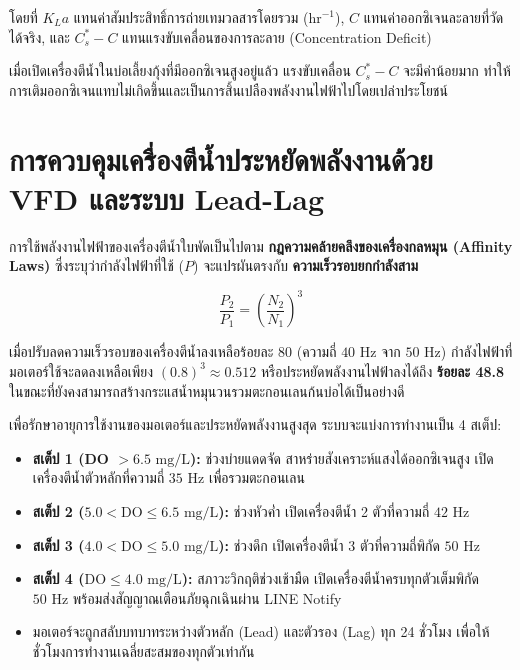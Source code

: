 โดยที่ $K_L a$ แทนค่าสัมประสิทธิ์การถ่ายเทมวลสารโดยรวม ($\text{hr}^{-1}$), $C$ แทนค่าออกซิเจนละลายที่วัดได้จริง, และ $C^*_s - C$ แทนแรงขับเคลื่อนของการละลาย (Concentration Deficit)

เมื่อเปิดเครื่องตีน้ำในบ่อเลี้ยงกุ้งที่มีออกซิเจนสูงอยู่แล้ว แรงขับเคลื่อน $C^*_s - C$ จะมีค่าน้อยมาก ทำให้การเติมออกซิเจนแทบไม่เกิดขึ้นและเป็นการสิ้นเปลืองพลังงานไฟฟ้าไปโดยเปล่าประโยชน์

\section{การควบคุมเครื่องตีน้ำประหยัดพลังงานด้วย VFD และระบบ Lead-Lag}

การใช้พลังงานไฟฟ้าของเครื่องตีน้ำใบพัดเป็นไปตาม \textbf{กฎความคล้ายคลึงของเครื่องกลหมุน (Affinity Laws)} ซึ่งระบุว่ากำลังไฟฟ้าที่ใช้ ($P$) จะแปรผันตรงกับ \textbf{ความเร็วรอบยกกำลังสาม}

\begin{equation}
\frac{P_2}{P_1} = \left( \frac{N_2}{N_1} \right)^3
\label{eq:affinity_laws}
\end{equation}

เมื่อปรับลดความเร็วรอบของเครื่องตีน้ำลงเหลือร้อยละ 80 (ความถี่ $40\text{ Hz}$ จาก $50\text{ Hz}$) กำลังไฟฟ้าที่มอเตอร์ใช้จะลดลงเหลือเพียง $(0.8)^3 \approx 0.512$ หรือประหยัดพลังงานไฟฟ้าลงได้ถึง \textbf{ร้อยละ 48.8} ในขณะที่ยังคงสามารถสร้างกระแสน้ำหมุนวนรวมตะกอนเลนก้นบ่อได้เป็นอย่างดี

\begin{theorybox}
เพื่อรักษาอายุการใช้งานของมอเตอร์และประหยัดพลังงานสูงสุด ระบบจะแบ่งการทำงานเป็น 4 สเต็ป:
\begin{itemize}[leftmargin=1.5em]
    \item \textbf{สเต็ป 1 (DO $> 6.5\text{ mg/L}$):} ช่วงบ่ายแดดจัด สาหร่ายสังเคราะห์แสงได้ออกซิเจนสูง เปิดเครื่องตีน้ำตัวหลักที่ความถี่ $35\text{ Hz}$ เพื่อรวมตะกอนเลน
    \item \textbf{สเต็ป 2 ($5.0 < \text{DO} \le 6.5\text{ mg/L}$):} ช่วงหัวค่ำ เปิดเครื่องตีน้ำ 2 ตัวที่ความถี่ $42\text{ Hz}$
    \item \textbf{สเต็ป 3 ($4.0 < \text{DO} \le 5.0\text{ mg/L}$):} ช่วงดึก เปิดเครื่องตีน้ำ 3 ตัวที่ความถี่พิกัด $50\text{ Hz}$
    \item \textbf{สเต็ป 4 ($\text{DO} \le 4.0\text{ mg/L}$):} สภาวะวิกฤติช่วงเช้ามืด เปิดเครื่องตีน้ำครบทุกตัวเต็มพิกัด $50\text{ Hz}$ พร้อมส่งสัญญาณเตือนภัยฉุกเฉินผ่าน LINE Notify
    \item มอเตอร์จะถูกสลับบทบาทระหว่างตัวหลัก (Lead) และตัวรอง (Lag) ทุก 24 ชั่วโมง เพื่อให้ชั่วโมงการทำงานเฉลี่ยสะสมของทุกตัวเท่ากัน
\end{itemize}
\end{theorybox}

